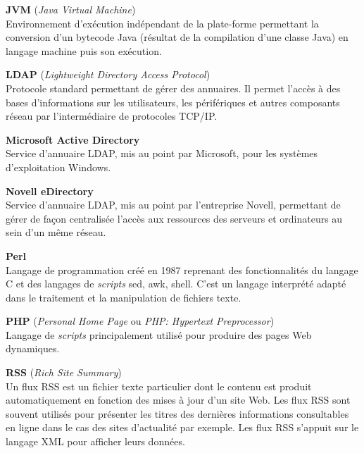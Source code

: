 \vspace{0.5cm}

\textbf{JVM} (\textit{Java Virtual Machine})\\
Environnement d'ex\'ecution ind\'ependant de la plate-forme permettant la conversion d'un bytecode Java (r\'esultat de la compilation d'une classe Java) en langage machine puis son ex\'ecution.

\vspace{0.5cm}

\textbf{LDAP} (\textit{Lightweight Directory Access Protocol})\\
Protocole standard permettant de g\'erer des annuaires. 
Il permet l'acc\`es \`a des bases d'informations sur les utilisateurs, les p\'erif\'eriques et autres composants r\'eseau par l'interm\'ediaire de protocoles TCP/IP.

\vspace{0.5cm}

\textbf{Microsoft Active Directory}\\
Service d'annuaire LDAP, mis au point par Microsoft, pour les syst\`emes d'exploitation Windows.

\vspace{0.5cm}

\textbf{Novell eDirectory}\\
Service d'annuaire LDAP, mis au point par l'entreprise Novell, permettant de g\'erer de fa\c{c}on centralis\'ee l'acc\`es aux ressources des serveurs et ordinateurs au sein d'un m\^eme r\'eseau.

\vspace{0.5cm}

\textbf{Perl}\\
Langage de programmation cr\'e\'e en 1987 reprenant des fonctionnalit\'es du langage C et des langages de \textit{scripts} sed, awk, shell.
C'est un langage interpr\'et\'e adapt\'e dans le traitement et la manipulation de fichiers texte.

\vspace{0.5cm}

\textbf{PHP} (\textit{Personal Home Page} ou \textit{PHP: Hypertext Preprocessor})\\
Langage de \textit{scripts} principalement utilis\'e pour produire des pages Web dynamiques.

\vspace{0.5cm}

\textbf{RSS} (\textit{Rich Site Summary})\\
Un flux RSS est un fichier texte particulier dont le contenu est produit automatiquement en fonction des mises \`a jour d'un site Web.
Les flux RSS sont souvent utilis\'es pour pr\'esenter les titres des derni\`eres informations consultables en ligne dans le cas des sites d'actualit\'e par exemple.
Les flux RSS s'appuit sur le langage XML pour afficher leurs donn\'ees.

